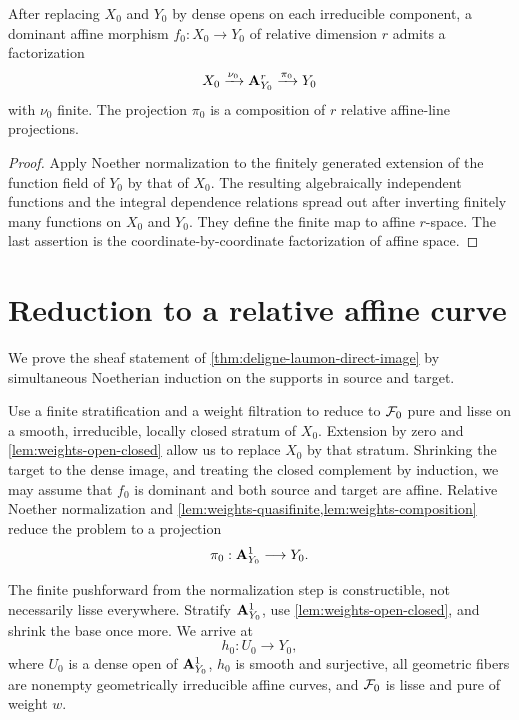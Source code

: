 \begin{lemma}
\label{lem:relative-noether-normalization}
After replacing \(X_0\) and \(Y_0\) by dense opens on each irreducible
component, a dominant affine morphism \(f_0:X_0\to Y_0\) of relative
dimension \(r\) admits a factorization
\[
 X_0\xrightarrow{\nu_0}\mathbf A^r_{Y_0}
 \xrightarrow{\pi_0}Y_0
\]
with \(\nu_0\) finite.  The projection \(\pi_0\) is a composition of
\(r\) relative affine-line projections.
\end{lemma}

\begin{proof}
Apply Noether normalization to the finitely generated extension of the
function field of \(Y_0\) by that of \(X_0\).  The resulting algebraically
independent functions and the integral dependence relations spread out
after inverting finitely many functions on \(X_0\) and \(Y_0\).  They
define the finite map to affine \(r\)-space.  The last assertion is the
coordinate-by-coordinate factorization of affine space.
\end{proof}

\section{Reduction to a relative affine curve}

We prove the sheaf statement of
\cref{thm:deligne-laumon-direct-image} by simultaneous Noetherian
induction on the supports in source and target.

Use a finite stratification and a weight filtration to reduce to
\(\mathcal F_0\) pure and lisse on a smooth, irreducible, locally closed
stratum of \(X_0\).  Extension by zero and
\cref{lem:weights-open-closed} allow us to replace \(X_0\) by that
stratum.  Shrinking the target to the dense image, and treating the
closed complement by induction, we may assume that \(f_0\) is dominant
and both source and target are affine.  Relative Noether normalization
and \cref{lem:weights-quasifinite,lem:weights-composition} reduce the
problem to a projection
\[
  \pi_0:\mathbf A^1_{Y_0}\longrightarrow Y_0.
\]

The finite pushforward from the normalization step is constructible, not
necessarily lisse everywhere.  Stratify \(\mathbf A^1_{Y_0}\), use
\cref{lem:weights-open-closed}, and shrink the base once more.  We arrive
at
\[
  h_0:U_0\longrightarrow Y_0,
\]
where \(U_0\) is a dense open of \(\mathbf A^1_{Y_0}\), \(h_0\) is smooth and
surjective, all geometric fibers are nonempty geometrically irreducible
affine curves, and \(\mathcal F_0\) is lisse and pure of weight \(w\).

